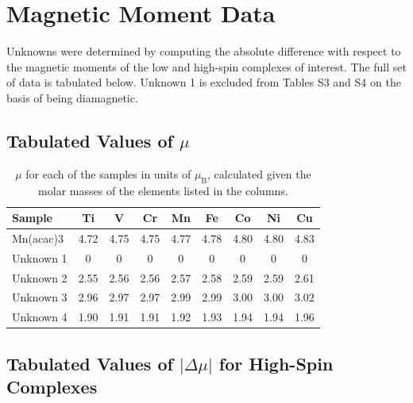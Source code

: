 \documentclass[journal = jacsat, manuscript = suppinfo]{achemso}
\begin{document}
\section{Magnetic Moment Data}

Unknowns were determined by computing the absolute difference with respect to
the magnetic moments of the low and high-spin complexes of interest. The full
set of data is tabulated below. Unknown 1 is excluded from Tables S3 and S4 on
the basis of being diamagnetic.

\subsection{Tabulated Values of $\mu$}

\begin{table}[H]
\begin{tabular}{lcccccccc}
\toprule
Sample &        Ti &         V &        Cr &        Mn &        Fe &        Co &        Ni &        Cu \\
\midrule
Mn(acac)3 &  4.72 &  4.75 &  4.75 &  4.77 &  4.78 &  4.80 &  4.80 &  4.83 \\
Unknown 1 &  0    &  0    &  0    &  0    &  0    &  0    &  0    &  0    \\
Unknown 2 &  2.55 &  2.56 &  2.56 &  2.57 &  2.58 &  2.59 &  2.59 &  2.61 \\
Unknown 3 &  2.96 &  2.97 &  2.97 &  2.99 &  2.99 &  3.00 &  3.00 &  3.02 \\
Unknown 4 &  1.90 &  1.91 &  1.91 &  1.92 &  1.93 &  1.94 &  1.94 &  1.96 \\
\bottomrule
\end{tabular}
\caption{$\mu$ for each of the samples in units of $\mu_\text{B}$, calculated
given the molar masses of the elements listed in the columns.}
\end{table}

\subsection{Tabulated Values of $|\Delta\mu|$ for High-Spin Complexes}
\end{document}
